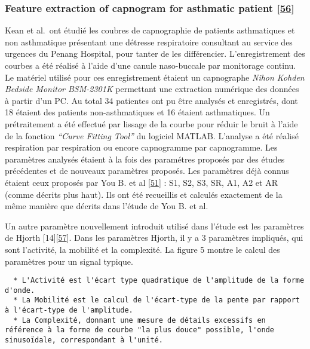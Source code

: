 \documentclass[12pt,]{article}
\begin{document}
\hypertarget{feature-extraction-of-capnogram-for-asthmatic-patient-kean2010feature}{%
\subsubsection{\texorpdfstring{Feature extraction of capnogram for
asthmatic patient
{[}\protect\hyperlink{ref-kean2010feature}{56}{]}}{Feature extraction of capnogram for asthmatic patient {[}56{]}}}\label{feature-extraction-of-capnogram-for-asthmatic-patient-kean2010feature}}

Kean et al.~ont étudié les coubres de capnographie de patients
asthmatiques et non asthmatique présentant une détresse respiratoire
consultant au service des urgences du Penang Hospital, pour tanter de
les différencier. L'enregistrement des courbes a été réalisé à l'aide
d'une canule naso-buccale par monitorage continu. Le matériel utilisé
pour ces enregistrement étaient un capnographe \emph{Nihon Kohden
Bedside Monitor BSM-2301K} permettant une extraction numérique des
données à partir d'un PC. Au total 34 patientes ont pu être analysés et
enregistrés, dont 18 étaient des patients non-asthmatiques et 16 étaient
asthmatiques. Un prétraitement a été effectué par lissage de la courbe
pour réduir le bruit à l'aide de la fonction \emph{``Curve Fitting
Tool''} du logiciel MATLAB. L'analyse a été réalisé respiration par
respiration ou encore capnogramme par capnogramme. Les paramètres
analysés étaient à la fois des paramétres proposés par des études
précédentes et de nouveaux paramètres proposés. Les paramètres déjà
connus étaient ceux proposés par You B. et al
{[}\protect\hyperlink{ref-you1994expiratory}{51}{]} : S1, S2, S3, SR,
A1, A2 et AR (comme décrits plus haut). Ils ont été recueillis et
calculés exactement de la même manière que décrits dans l'étude de You
B. et al.

Un autre paramètre nouvellement introduit utilisé dans l'étude est les
paramètres de Hjorth
{[}14{]}{[}\protect\hyperlink{ref-hjorth1970eeg}{57}{]}. Dans les
paramètres Hjorth, il y a 3 paramètres impliqués, qui sont l'activité,
la mobilité et la complexité. La figure 5 montre le calcul des
paramètres pour un signal typique.

\begin{verbatim}
  * L'Activité est l'écart type quadratique de l'amplitude de la forme d'onde. 
  * La Mobilité est le calcul de l'écart-type de la pente par rapport à l'écart-type de l'amplitude. 
  * La Complexité, donnant une mesure de détails excessifs en référence à la forme de courbe "la plus douce" possible, l'onde sinusoïdale, correspondant à l'unité.
\end{verbatim}
\end{document}
